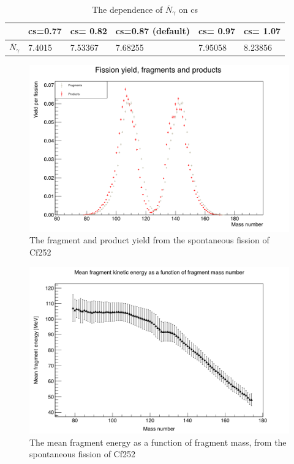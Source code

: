 \documentclass[]{article}
\begin{document}
\begin{table} [H]
	\centering
	\caption{The dependence of  $\overline{N}_{\gamma}$ on cs}
	\begin{tabularx}{\textwidth}{XXXXXX} \hline
		\label{tab:dependence_on_c}
		 & cs=0.77 & cs= 0.82 & cs=0.87 (default) & cs= 0.97 & cs= 1.07 \\ \hline
		$\overline{N}_{\gamma}$ & 7.4015 & 7.53367 & 7.68255 & 7.95058 & 8.23856 \\
		\hline
	\end{tabularx}
\end{table}

\begin{figure} [H]
	\centering
	\includegraphics[scale=0.37]{Cf252_sf_fragment_product_yield.png}
	\caption{The fragment and product yield from the spontaneous fission of Cf252}
	\label{fig:Cf252_sf_fragment_product_yield}
\end{figure}

\begin{figure} [H]
	\centering
	\includegraphics[scale=0.37]{Cf252_sf_mean_fragment_kinetic_enery_function_of_fragment_mass_number.png}
	\caption{The mean fragment energy as a function of fragment mass, from the spontaneous fission of Cf252}
	\label{fig:Cf252_sf_mean_fragment_kinetic_enery_function_of_fragment_mass_number}
\end{figure}
\end{document}
